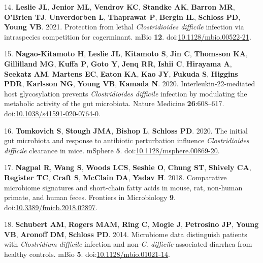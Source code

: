 \documentclass[
  12pt,
]{article}
\newenvironment{cslreferences}%
  {}%
  {\par}
\begin{document}
\begin{cslreferences}
\leavevmode\hypertarget{ref-Leslie2021}{}%
14. \textbf{Leslie JL}, \textbf{Jenior ML}, \textbf{Vendrov KC},
\textbf{Standke AK}, \textbf{Barron MR}, \textbf{O'Brien TJ},
\textbf{Unverdorben L}, \textbf{Thaprawat P}, \textbf{Bergin IL},
\textbf{Schloss PD}, \textbf{Young VB}. 2021. Protection from lethal
\emph{Clostridioides difficile} infection via intraspecies competition
for cogerminant. mBio \textbf{12}.
doi:\href{https://doi.org/10.1128/mbio.00522-21}{10.1128/mbio.00522-21}.

\leavevmode\hypertarget{ref-NagaoKitamoto2020}{}%
15. \textbf{Nagao-Kitamoto H}, \textbf{Leslie JL}, \textbf{Kitamoto S},
\textbf{Jin C}, \textbf{Thomsson KA}, \textbf{Gillilland MG},
\textbf{Kuffa P}, \textbf{Goto Y}, \textbf{Jenq RR}, \textbf{Ishii C},
\textbf{Hirayama A}, \textbf{Seekatz AM}, \textbf{Martens EC},
\textbf{Eaton KA}, \textbf{Kao JY}, \textbf{Fukuda S}, \textbf{Higgins
PDR}, \textbf{Karlsson NG}, \textbf{Young VB}, \textbf{Kamada N}. 2020.
Interleukin-22-mediated host glycosylation prevents \emph{Clostridioides
difficile} infection by modulating the metabolic activity of the gut
microbiota. Nature Medicine \textbf{26}:608--617.
doi:\href{https://doi.org/10.1038/s41591-020-0764-0}{10.1038/s41591-020-0764-0}.

\leavevmode\hypertarget{ref-Tomkovich2020}{}%
16. \textbf{Tomkovich S}, \textbf{Stough JMA}, \textbf{Bishop L},
\textbf{Schloss PD}. 2020. The initial gut microbiota and response to
antibiotic perturbation influence \emph{Clostridioides difficile}
clearance in mice. mSphere \textbf{5}.
doi:\href{https://doi.org/10.1128/msphere.00869-20}{10.1128/msphere.00869-20}.

\leavevmode\hypertarget{ref-Nagpal2018}{}%
17. \textbf{Nagpal R}, \textbf{Wang S}, \textbf{Woods LCS},
\textbf{Seshie O}, \textbf{Chung ST}, \textbf{Shively CA},
\textbf{Register TC}, \textbf{Craft S}, \textbf{McClain DA},
\textbf{Yadav H}. 2018. Comparative microbiome signatures and
short-chain fatty acids in mouse, rat, non-human primate, and human
feces. Frontiers in Microbiology \textbf{9}.
doi:\href{https://doi.org/10.3389/fmicb.2018.02897}{10.3389/fmicb.2018.02897}.

\leavevmode\hypertarget{ref-Schubert2014}{}%
18. \textbf{Schubert AM}, \textbf{Rogers MAM}, \textbf{Ring C},
\textbf{Mogle J}, \textbf{Petrosino JP}, \textbf{Young VB},
\textbf{Aronoff DM}, \textbf{Schloss PD}. 2014. Microbiome data
distinguish patients with \emph{Clostridium difficile} infection and
non-\emph{C. difficile}-associated diarrhea from healthy controls. mBio
\textbf{5}.
doi:\href{https://doi.org/10.1128/mbio.01021-14}{10.1128/mbio.01021-14}.


\end{cslreferences}
\end{document}
